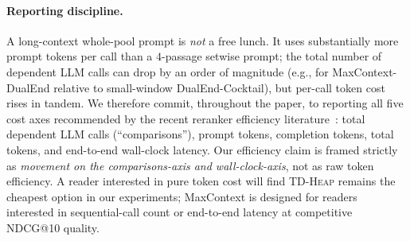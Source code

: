 \paragraph{Reporting discipline.} A long-context whole-pool prompt is
\emph{not} a free lunch. It uses substantially more prompt tokens per call
than a $4$-passage setwise prompt; the total number of dependent LLM calls
can drop by an order of magnitude (e.g., for MaxContext-DualEnd relative to
small-window DualEnd-Cocktail), but per-call token cost rises in tandem. We
therefore commit, throughout the paper, to reporting all five cost axes
recommended by the recent reranker efficiency
literature~\citep{peng2025flopsreranking}: total dependent LLM calls
(``comparisons''), prompt tokens, completion tokens, total tokens, and
end-to-end wall-clock latency. Our efficiency claim is framed strictly as
\emph{movement on the comparisons-axis and wall-clock-axis}, not as raw token
efficiency. A reader interested in pure token cost will find \textsc{TD-Heap}
remains the cheapest option in our experiments; MaxContext is designed for
readers interested in sequential-call count or end-to-end latency at
competitive NDCG@10 quality.

